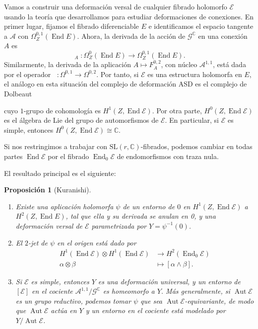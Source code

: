 \documentclass[12pt, a4paper]{amsart}
\newcommand\CC{\mathbb{C}}
\newcommand\SL{\mathrm{SL}}
\newcommand\Aa{\mathcal{A}}
\newcommand\GG{\mathcal{G}}
\newcommand\EE{\mathscr{E}}
\DeclareMathOperator\Aut{Aut}
\DeclareMathOperator\End{End}
\DeclareMathOperator\delbar{\bar{\partial}}
\newtheorem{prop}[thm]{Proposición}
\theoremstyle{remark} \newtheorem{rmk}[thm]{Observación}
\theoremstyle{remark} \newtheorem{rmks}[thm]{Observaciones}
\theoremstyle{definition} \newtheorem{defn}[thm]{Definición}
\theoremstyle{definition} \newtheorem{ejs}[thm]{Ejemplos}
\theoremstyle{definition} \newtheorem{ej}[thm]{Ejemplo}
\begin{document}
Vamos a construir una deformación versal de cualquier fibrado holomorfo $\EE$ usando la teoría que desarrollamos para estudiar deformaciones de conexiones. En primer lugar, fijamos el fibrado diferenciable $E$ e identificamos el espacio tangente a $\Aa$ con $\Omega^{0,1}_Z(\End E)$. Ahora, la derivada de la acción de $\GG^\CC$ en una conexión $A$ es
\begin{equation*}
	\delbar_A: \Omega^0_Z(\End E) \longrightarrow \Omega^{0,1}_Z(\End E).
\end{equation*} 
Similarmente, la derivada de la aplicación $A\mapsto F^{0,2}_A$, con núcleo $\Aa^{1,1}$, está dada por el operador $\delbar:\Omega^{0,1}\rightarrow \Omega^{0,2}$. Por tanto, si $\EE$ es una estructura holomorfa en $E$, el análogo en esta situación del complejo de deformación ASD es el complejo de Dolbeaut
\begin{center}
\end{center}
cuyo $1$-grupo de cohomología es $H^1(Z,\End \EE)$. Por otra parte, $H^0(Z,\End \EE)$ es el álgebra de Lie del grupo de automorfismos de $\EE$. En particular, si $\EE$ es simple, entonces $H^0(Z,\End \EE) \cong \CC$. 

Si nos restringimos a trabajar con $\SL(r,\CC)$-fibrados, podemos cambiar en todas partes $\End \EE$ por el fibrado $\End_0 \EE$ de endomorfismos con traza nula.

El resultado principal es el siguiente:

\begin{prop}[Kuranishi]
\begin{enumerate}
	\item Existe una aplicación holomorfa $\psi$ de un entorno de $0$ en $H^1(Z,\End \EE)$ a $H^2(Z,\End E)$, tal que ella y su derivada se anulan en 0, y una deformación versal de $\EE$ parametrizada por $Y=\psi^{-1}(0)$.	
	\item El $2$-jet de $\psi$ en el origen está dado por 
		\begin{align*}
			H^1(\End \EE) \otimes H^1(\End \EE) & \longrightarrow H^2(\End_0 \EE) \\
			\alpha \otimes \beta & \longmapsto [\alpha \wedge \beta].
		\end{align*} 
	\item Si $\EE$ es simple, entonces $Y$ es una deformación universal, y un entorno de $[\EE]$ en el cociente $\Aa^{1,1}/\GG^\CC$ es homeomorfo a $Y$. Más generalmente, si $\Aut \EE$ es un grupo reductivo, podemos tomar $\psi$ que sea $\Aut \EE$-equivariante, de modo que $\Aut \EE$ actúa en $Y$ y un entorno en el cociente está modelado por $Y/\Aut \EE$.
\end{enumerate}	
\end{prop}
\end{document}
